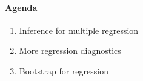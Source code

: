 \documentclass[10pt]{article}\usepackage[]{graphicx}\usepackage[]{color}
\begin{document}

\paragraph{Agenda}
\begin{enumerate}
  \itemsep0em 
  \item Inference for multiple regression
  \item More regression diagnostics
  \item Bootstrap for regression
\end{enumerate}

% 
% 
% 
% 
% 
\end{document}
